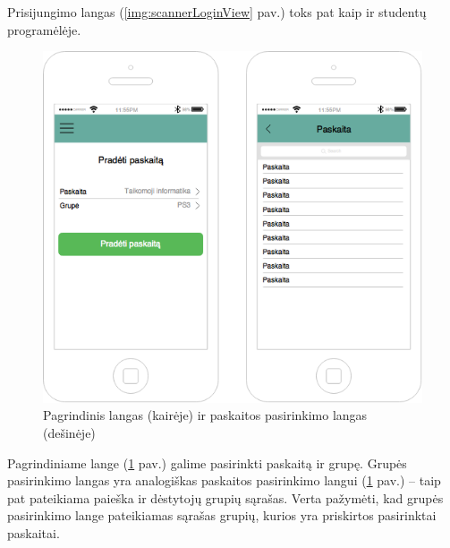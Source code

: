 \documentclass{VUMIFPSkursinis}
\begin{document}
Prisijungimo langas (\ref{img:scannerLoginView} pav.) toks pat kaip ir studentų programėlėje.

\begin{figure}[H]
	\centering
	\includegraphics[scale=0.5]{img/kursinio_app_dest_main}
	\caption{Pagrindinis langas (kairėje) ir paskaitos pasirinkimo langas (dešinėje)}
	\label{img:scannerMainView}
\end{figure}

Pagrindiniame lange (\ref{img:scannerMainView} pav.) galime pasirinkti paskaitą ir grupę. Grupės pasirinkimo langas yra analogiškas paskaitos pasirinkimo langui (\ref{img:scannerMainView} pav.) – taip pat pateikiama paieška ir dėstytojų grupių sąrašas. Verta pažymėti, kad grupės pasirinkimo lange pateikiamas sąrašas grupių, kurios yra priskirtos pasirinktai paskaitai.
\end{document}

